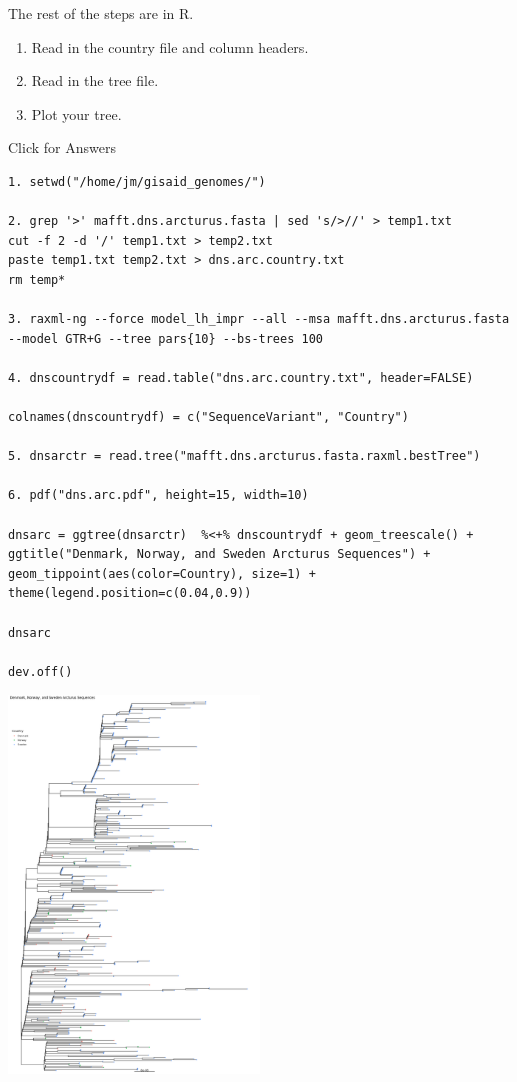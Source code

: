 \documentclass[
]{book}
\begin{document}
The rest of the steps are in R.

\begin{enumerate}
\def\labelenumi{\arabic{enumi}.}
\setcounter{enumi}{3}
\item
  Read in the country file and column headers.
\item
  Read in the tree file.
\item
  Plot your tree.
\end{enumerate}

Click for Answers

\begin{verbatim}
1. setwd("/home/jm/gisaid_genomes/")

2. grep '>' mafft.dns.arcturus.fasta | sed 's/>//' > temp1.txt
cut -f 2 -d '/' temp1.txt > temp2.txt
paste temp1.txt temp2.txt > dns.arc.country.txt
rm temp*

3. raxml-ng --force model_lh_impr --all --msa mafft.dns.arcturus.fasta --model GTR+G --tree pars{10} --bs-trees 100

4. dnscountrydf = read.table("dns.arc.country.txt", header=FALSE)

colnames(dnscountrydf) = c("SequenceVariant", "Country")

5. dnsarctr = read.tree("mafft.dns.arcturus.fasta.raxml.bestTree")

6. pdf("dns.arc.pdf", height=15, width=10)

dnsarc = ggtree(dnsarctr)  %<+% dnscountrydf + geom_treescale() + ggtitle("Denmark, Norway, and Sweden Arcturus Sequences") + geom_tippoint(aes(color=Country), size=1) + theme(legend.position=c(0.04,0.9))

dnsarc

dev.off()
\end{verbatim}

\hfill\break

\includegraphics[width=0.5\textwidth,height=\textheight]{./Figures/dns.arc.png}
\end{document}
